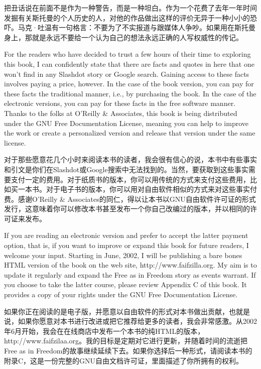 \ifdefined\chs
把丑话说在前面不是作为一种警告，而是一种坦白。作为一个花费了去年一年时间发掘有关斯托曼的个人历史的人，对他的作品做出这样的评价无异于一种小小的恐吓。马克·吐温有一句格言：不要为了不实报道与跟媒体人争吵。如果用在斯托曼身上，那就是永远不要给一个认为自己的想法永远正确的人写权威性的传记。
\fi

\ifdefined\eng
For the readers who have decided to trust a few hours of their time to exploring this book, I can confidently state that there are facts and quotes in here that one won't find in any Slashdot story or Google search. Gaining access to these facts involves paying a price, however. In the case of the book version, you can pay for these facts the traditional manner, i.e., by purchasing the book. In the case of the electronic versions, you can pay for these facts in the free software manner. Thanks to the folks at O'Reilly \& Associates, this book is being distributed under the GNU Free Documentation License, meaning you can help to improve the work or create a personalized version and release that version under the same license.
\fi

\ifdefined\chs
对于那些愿意花几个小时来阅读本书的读者，我会很有信心的说，本书中有些事实和引文是你们在Slashdot或Google搜索中无法找到的。当然，要获取到这些事实需要支付一定的费用。对于纸质书的版本，你可以用传统的方式来支付这些费用，比如买一本书。对于电子书的版本，你可以用对自由软件相似的方式来对这些事实付费。感谢O'Reilly \& Associates的同仁，得以让本书以GNU自由软件许可证的形式发行，这意味着你可以修改本书甚至发布一个你自己改编过的版本，并以相同的许可证来发布。
\fi

\ifdefined\eng
If you are reading an electronic version and prefer to accept the latter payment option, that is, if you want to improve or expand this book for future readers, I welcome your input. Starting in June, 2002, I will be publishing a bare bones HTML version of the book on the web site, http://www.faifzilla.org. My aim is to update it regularly and expand the Free as in Freedom story as events warrant. If you choose to take the latter course, please review Appendix C of this book. It provides a copy of your rights under the GNU Free Documentation License.
\fi

\ifdefined\chs
如果你正在阅读的是电子版，并愿意以自由软件的形式对本书做出贡献，也就是说，如果你愿意对本书进行改进或把它推荐给更多的读者，我会非常感激。从2002年6月开始，我会在在线商店中发布一个本书的纯HTML的版本，http://www.faifzilaa.org。我的目标是定期对它进行更新，并随着时间的流逝把Free as in Freedom的故事继续延续下去。如果你选择后一种形式，请阅读本书的附录C，这是一份完整的GNU自由文档许可证，里面描述了你所拥有的权利。
\fi

